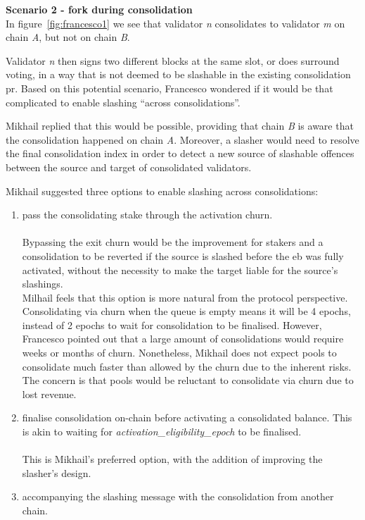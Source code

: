\noindent
\textbf{Scenario 2 - fork during consolidation} \\
In figure~\ref{fig:francesco1} we see that validator \textit{n} consolidates to validator \textit{m} on chain \textit{A}, but not on chain \textit{B}. 

Validator \textit{n} then signs two different blocks at the same slot, or does surround voting, in a way that is not deemed to be slashable in the existing consolidation \gls{pr}. Based on this potential scenario, Francesco wondered if it would be that complicated to enable slashing ``across consolidations''.

Mikhail replied that this would be possible, providing that chain \textit{B} is aware that the consolidation happened on chain \textit{A}. Moreover, a slasher would need to resolve the final consolidation index in order to detect a new source of slashable offences between the source and target of consolidated validators.

Mikhail suggested three options to enable slashing across consolidations:
\begin{enumerate}
\item pass the consolidating stake through the activation churn.\\
\\
Bypassing the exit churn would be the improvement for stakers and a consolidation to be reverted if the source is slashed before the \gls{eb} was fully activated, without the necessity to make the target liable for the source's slashings.\\
Milhail feels that this option is more natural from the protocol perspective. Consolidating via churn when the queue is empty means it will be 4 epochs, instead of 2 epochs to wait for consolidation to be finalised. However, Francesco pointed out that a large amount of consolidations would require weeks or months of churn.  Nonetheless, Mikhail does not expect pools to consolidate much faster than allowed by the churn due to the inherent risks. The concern is that pools would be reluctant to consolidate via churn due to lost revenue. 

\item finalise consolidation on-chain before activating a consolidated balance. This is akin to waiting for \textit{activation\_eligibility\_epoch} to be finalised. \\
\\
This is Mikhail's preferred option, with the addition of improving the slasher's design.
\item accompanying the slashing message with the consolidation from another chain.
\end{enumerate}



